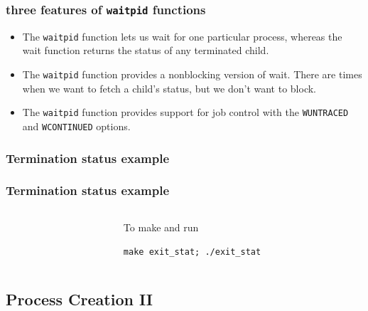 \documentclass[newPxFont,sthlmFooter,nooffset]{beamer}
\begin{document}
\begin{frame}[t]
  \frametitle{three features of \texttt{waitpid} functions }
  \begin{itemize}
  \item The \texttt{waitpid} function lets us wait for one particular
    process, whereas the wait function returns the status of any
    terminated child.
  \item The \texttt{waitpid} function provides a nonblocking version
    of wait. There are times when we want to fetch a child’s status,
    but we don’t want to block.
  \item The \texttt{waitpid} function provides support for job control
    with the \texttt{WUNTRACED} and \texttt{WCONTINUED} options.
  \end{itemize}
\end{frame}

\begin{frame}[containsverbatim,t]
  \frametitle{Termination status example}
  
  

\end{frame}

\begin{frame}[containsverbatim,t]
  \frametitle{Termination status example}
  \begin{columns}
    \begin{column}{0.6\linewidth}
      
    \end{column}
    \begin{column}{0.35\linewidth}
      To make and run

     \texttt{make exit\_stat; ./exit\_stat}
    \end{column}
  \end{columns}
\end{frame}


\subsection{Process Creation II}
\end{document}
